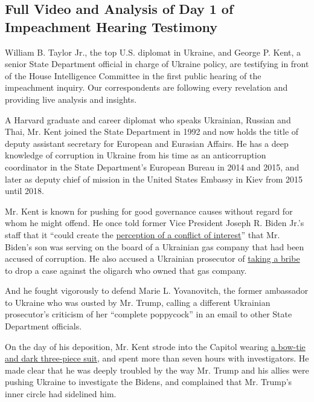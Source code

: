 \hypertarget{full-video-and-analysis-of-day-1-of-impeachment-hearing-testimony}{%
\subsection{Full Video and Analysis of Day 1 of Impeachment Hearing
Testimony}\label{full-video-and-analysis-of-day-1-of-impeachment-hearing-testimony}}

William B. Taylor Jr., the top U.S. diplomat in Ukraine, and George P.
Kent, a senior State Department official in charge of Ukraine policy,
are testifying in front of the House Intelligence Committee in the first
public hearing of the impeachment inquiry. Our correspondents are
following every revelation and providing live analysis and insights.

A Harvard graduate and career diplomat who speaks Ukrainian, Russian and
Thai, Mr. Kent joined the State Department in 1992 and now holds the
title of deputy assistant secretary for European and Eurasian Affairs.
He has a deep knowledge of corruption in Ukraine from his time as an
anticorruption coordinator in the State Department's European Bureau in
2014 and 2015, and later as deputy chief of mission in the United States
Embassy in Kiev from 2015 until 2018.

Mr. Kent is known for pushing for good governance causes without regard
for whom he might offend. He once told former Vice President Joseph R.
Biden Jr.'s staff that it ``could create the
\href{https://www.nytimes.com/2019/11/10/us/politics/joe-biden-ukraine.html}{perception
of a conflict of interest}'' that Mr. Biden's son was serving on the
board of a Ukrainian gas company that had been accused of corruption. He
also accused a Ukrainian prosecutor of
\href{https://www.nytimes.com/2019/10/15/us/politics/impeachment-george-kent-state.html}{taking
a bribe} to drop a case against the oligarch who owned that gas company.

And he fought vigorously to defend Marie L. Yovanovitch, the former
ambassador to Ukraine who was ousted by Mr. Trump, calling a different
Ukrainian prosecutor's criticism of her ``complete poppycock'' in an
email to other State Department officials.

On the day of his deposition, Mr. Kent strode into the Capitol wearing
\href{https://www.nytimes.com/2019/11/13/style/george-kent-bow-tie.html}{a
bow-tie and dark three-piece suit}, and spent more than seven hours with
investigators. He made clear that he was deeply troubled by the way Mr.
Trump and his allies were pushing Ukraine to investigate the Bidens, and
complained that Mr. Trump's inner circle had sidelined him.

